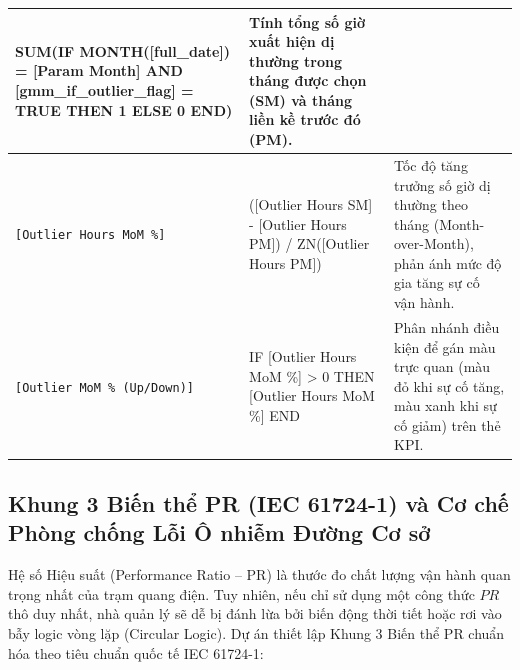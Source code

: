 \documentclass[12pt, a4paper]{report}
\begin{document}
\begin{table}[H]
\begin{tabularx}{\textwidth}{@{} >{\raggedright\arraybackslash}p{3.2cm} >{\raggedright\arraybackslash\ttfamily\scriptsize}p{6.0cm} >{\raggedright\arraybackslash}X @{}}
SUM(IF MONTH([full\_date]) = [Param Month] \newline
\quad AND [gmm\_if\_outlier\_flag] = TRUE \newline
\quad THEN 1 ELSE 0 END) & 
Tính tổng số giờ xuất hiện dị thường trong tháng được chọn (SM) và tháng liền kề trước đó (PM). \\
\midrule
\texttt{[Outlier Hours MoM \%]} & 
([Outlier Hours SM] - [Outlier Hours PM]) \newline
/ ZN([Outlier Hours PM]) & 
Tốc độ tăng trưởng số giờ dị thường theo tháng (Month-over-Month), phản ánh mức độ gia tăng sự cố vận hành. \\
\midrule
\texttt{[Outlier MoM \% (Up/Down)]} & 
IF [Outlier Hours MoM \%] > 0 \newline
THEN [Outlier Hours MoM \%] END & 
Phân nhánh điều kiện để gán màu trực quan (màu đỏ khi sự cố tăng, màu xanh khi sự cố giảm) trên thẻ KPI. \\
\bottomrule
\end{tabularx}

\end{table}

\subsection{Khung 3 Biến thể PR (IEC 61724-1) và Cơ chế Phòng chống Lỗi Ô nhiễm Đường Cơ sở}
\label{subsec:pr_triple_metrics}

Hệ số Hiệu suất (Performance Ratio -- PR) là thước đo chất lượng vận hành quan trọng nhất của trạm quang điện. Tuy nhiên, nếu chỉ sử dụng một công thức $PR$ thô duy nhất, nhà quản lý sẽ dễ bị đánh lừa bởi biến động thời tiết hoặc rơi vào bẫy logic vòng lặp (Circular Logic). Dự án thiết lập Khung 3 Biến thể PR chuẩn hóa theo tiêu chuẩn quốc tế IEC 61724-1:
\end{document}

